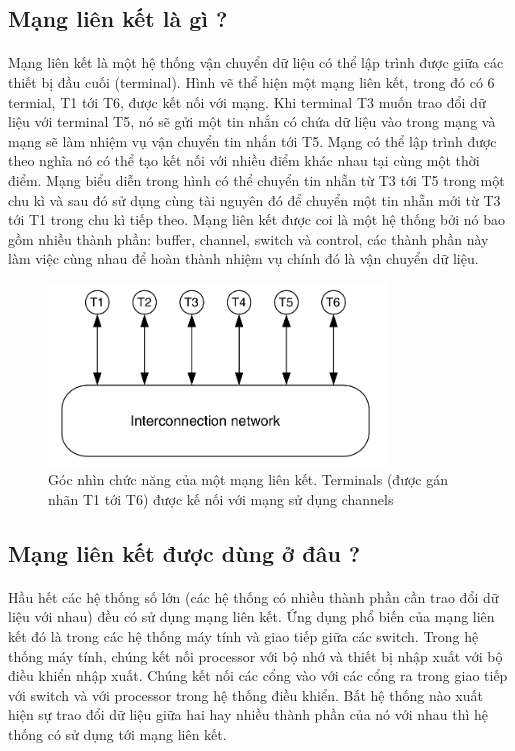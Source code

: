 \documentclass[../report.tex]{subfiles}
\begin{document}
\subsection{Mạng liên kết là gì ?}   
\paragraph*{}Mạng liên kết là một hệ thống vận chuyển dữ liệu có thể lập trình được giữa các thiết bị đầu cuối (terminal). Hình vẽ thể hiện một mạng liên kết, trong đó có 6 termial, T1 tới T6, được kết nối với mạng. Khi terminal T3 muốn trao đổi dữ liệu với terminal T5, nó sẽ gửi một tin nhắn có chứa dữ liệu vào trong mạng và mạng sẽ làm nhiệm vụ vận chuyển tin nhắn tới T5. Mạng có thể lập trình được theo nghĩa nó có thể tạo kết nối với nhiều điểm khác nhau tại cùng một thời điểm. Mạng biểu diễn trong hình có thể chuyển tin nhẵn từ T3 tới T5 trong một chu kì và sau đó sử dụng cùng tài nguyên đó để chuyển một tin nhẵn mới từ T3 tới T1 trong chu kì tiếp theo. Mạng liên kết được coi là một hệ thống bởi nó bao gồm nhiều thành phần: buffer, channel, switch và control, các thành phần này làm việc cùng nhau để hoàn thành nhiệm vụ chính đó là vận chuyển dữ liệu.
\begin{figure}[H]
\centering
\includegraphics[width=9cm]{figures/interconnection.png}
\caption{Góc nhìn chức năng của một mạng liên kết. Terminals (được gán nhãn T1 tới T6) được kế nối với mạng sử dụng channels}
\end{figure}

\subsection{Mạng liên kết được dùng ở đâu ?}
\paragraph*{} Hầu hết các hệ thống số lớn (các hệ thống có nhiều thành phần cần trao đổi dữ liệu với nhau) đều có sử dụng mạng liên kết. Ứng dụng phổ biến của mạng liên kết đó là trong các hệ thống máy tính và giao tiếp giữa các switch. Trong hệ thống máy tính, chúng kết nối processor với bộ nhớ và thiết bị nhập xuất với bộ điều khiển nhập xuất. Chúng kết nối các cổng vào với các cổng ra trong giao tiếp với switch và với processor trong hệ thống điều khiển. Bất hệ thống nào xuất hiện sự trao đổi dữ liệu giữa hai hay nhiều thành phần của nó với nhau thì hệ thống có sử dụng tới mạng liên kết.
\end{document}
